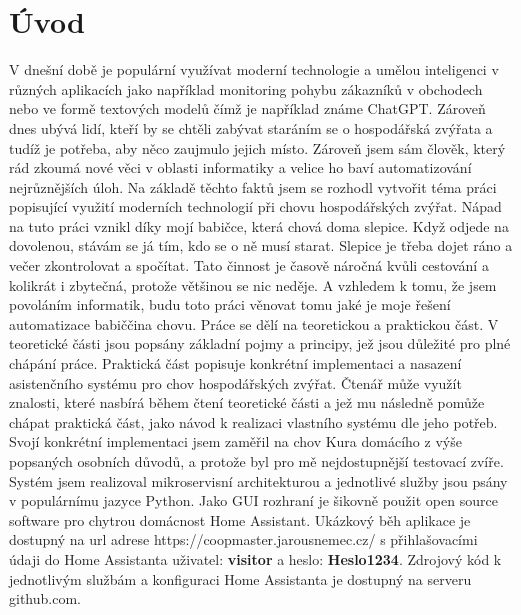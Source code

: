 \chapter{Úvod}
V dnešní době je populární využívat moderní technologie a umělou inteligenci v různých aplikacích jako například monitoring pohybu zákazníků v obchodech nebo ve formě textových modelů čímž je například známe ChatGPT. Zároveň dnes ubývá lidí, kteří by se chtěli zabývat staráním se o hospodářská zvýřata a tudíž je potřeba, aby něco zaujmulo jejich místo. Zároveň jsem sám člověk, který rád zkoumá nové věci v oblasti informatiky a velice ho baví automatizování nejrůznějších úloh. Na základě těchto faktů jsem se rozhodl vytvořit téma práci popisující využití moderních technologií při chovu hospodářských zvýřat. Nápad na tuto práci vznikl díky mojí babičce, která chová doma slepice. Když odjede na dovolenou, stávám se já tím, kdo se o ně musí starat. Slepice je třeba dojet ráno a večer zkontrolovat a spočítat. Tato činnost je časově náročná kvůli cestování a kolikrát i zbytečná, protože většinou se nic neděje. A vzhledem k tomu, že jsem povoláním informatik, budu toto práci věnovat tomu jaké je moje řešení automatizace babiččina chovu.
\newline
Práce se dělí na teoretickou a praktickou část. V teoretické části jsou popsány základní pojmy a principy, jež jsou důležité pro plné chápání práce. Praktická část popisuje konkrétní implementaci a nasazení asistenčního systému pro chov hospodářských zvýřat. Čtenář může využít znalosti, které nasbírá během čtení teoretické části a jež mu následně pomůže chápat praktická část, jako návod k realizaci vlastního systému dle jeho potřeb.
\newline
Svojí konkrétní implementaci jsem zaměřil na chov Kura domácího z výše popsaných osobních důvodů, a protože byl pro mě nejdostupnější testovací zvíře. Systém jsem realizoval mikroservisní architekturou a jednotlivé služby jsou psány v populárnímu jazyce Python. Jako GUI rozhraní je šikovně použit open source software pro chytrou domácnost Home Assistant.
\newline
Ukázkový běh aplikace je dostupný na url adrese https://coopmaster.jarousnemec.cz/ s přihlašovacími údaji do Home Assistanta uživatel: \textbf{visitor} a heslo: \textbf{Heslo1234}. Zdrojový kód k jednotlivým službám a konfiguraci Home Assistanta je dostupný na serveru github.com.
